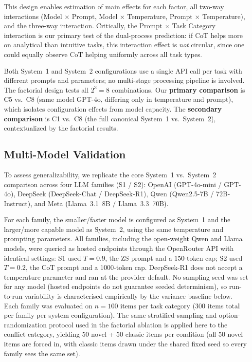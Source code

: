 \documentclass[conference]{IEEEtran}
\begin{document}
This design enables estimation of main effects for each factor, all two-way interactions (Model $\times$ Prompt, Model $\times$ Temperature, Prompt $\times$ Temperature), and the three-way interaction. Critically, the Prompt $\times$ Task Category interaction is our primary test of the dual-process prediction: if CoT helps more on analytical than intuitive tasks, this interaction effect is \textit{not} circular, since one could equally observe CoT helping uniformly across all task types.

Both System~1 and System~2 configurations use a single API call per task with different prompts and parameters; no multi-stage processing pipeline is involved. The factorial design tests all $2^3 = 8$ combinations. Our \textbf{primary comparison} is C5 vs.\ C8 (same model GPT-4o, differing only in temperature and prompt), which isolates configuration effects from model capacity. The \textbf{secondary comparison} is C1 vs.\ C8 (the full canonical System~1 vs.\ System~2), contextualized by the factorial results.

\subsection{Multi-Model Validation}
\label{sec:multimodel}

To assess generalizability, we replicate the core System~1 vs.\ System~2 comparison across four LLM families (S1 / S2): OpenAI (GPT-4o-mini / GPT-4o), DeepSeek (DeepSeek-Chat / DeepSeek-R1), Qwen (Qwen2.5-7B / 72B-Instruct), and Meta (Llama~3.1~8B / Llama~3.3~70B).

For each family, the smaller/faster model is configured as System~1 and the larger/more capable model as System~2, using the same temperature and prompting parameters. All families, including the open-weight Qwen and Llama models, were queried as hosted endpoints through the OpenRouter API with identical settings: S1 used $T = 0.9$, the ZS prompt and a 150-token cap; S2 used $T = 0.2$, the CoT prompt and a 1000-token cap. DeepSeek-R1 does not accept a temperature parameter and ran at the provider default. No sampling seed was set for any model (hosted endpoints do not guarantee seeded determinism), so run-to-run variability is characterised empirically by the variance baseline below. Each family was evaluated on $n = 100$ items per task category (300 items total per family per system configuration). The same stratified-sampling and option-randomization protocol used in the factorial ablation is applied here to the conflict category, yielding 50 novel + 50 classic items per condition (all 50 novel items are forced in, with classic items drawn under the shared fixed seed so every family sees the same set).
\end{document}
